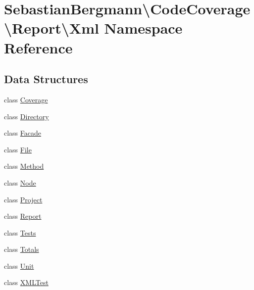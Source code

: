 \hypertarget{namespace_sebastian_bergmann_1_1_code_coverage_1_1_report_1_1_xml}{}\section{Sebastian\+Bergmann\textbackslash{}Code\+Coverage\textbackslash{}Report\textbackslash{}Xml Namespace Reference}
\label{namespace_sebastian_bergmann_1_1_code_coverage_1_1_report_1_1_xml}
\subsection*{Data Structures}
\begin{DoxyCompactItemize}
\item 
class \mbox{\hyperlink{class_sebastian_bergmann_1_1_code_coverage_1_1_report_1_1_xml_1_1_coverage}{Coverage}}
\item 
class \mbox{\hyperlink{class_sebastian_bergmann_1_1_code_coverage_1_1_report_1_1_xml_1_1_directory}{Directory}}
\item 
class \mbox{\hyperlink{class_sebastian_bergmann_1_1_code_coverage_1_1_report_1_1_xml_1_1_facade}{Facade}}
\item 
class \mbox{\hyperlink{class_sebastian_bergmann_1_1_code_coverage_1_1_report_1_1_xml_1_1_file}{File}}
\item 
class \mbox{\hyperlink{class_sebastian_bergmann_1_1_code_coverage_1_1_report_1_1_xml_1_1_method}{Method}}
\item 
class \mbox{\hyperlink{class_sebastian_bergmann_1_1_code_coverage_1_1_report_1_1_xml_1_1_node}{Node}}
\item 
class \mbox{\hyperlink{class_sebastian_bergmann_1_1_code_coverage_1_1_report_1_1_xml_1_1_project}{Project}}
\item 
class \mbox{\hyperlink{class_sebastian_bergmann_1_1_code_coverage_1_1_report_1_1_xml_1_1_report}{Report}}
\item 
class \mbox{\hyperlink{class_sebastian_bergmann_1_1_code_coverage_1_1_report_1_1_xml_1_1_tests}{Tests}}
\item 
class \mbox{\hyperlink{class_sebastian_bergmann_1_1_code_coverage_1_1_report_1_1_xml_1_1_totals}{Totals}}
\item 
class \mbox{\hyperlink{class_sebastian_bergmann_1_1_code_coverage_1_1_report_1_1_xml_1_1_unit}{Unit}}
\item 
class \mbox{\hyperlink{class_sebastian_bergmann_1_1_code_coverage_1_1_report_1_1_xml_1_1_x_m_l_test}{X\+M\+L\+Test}}
\end{DoxyCompactItemize}
